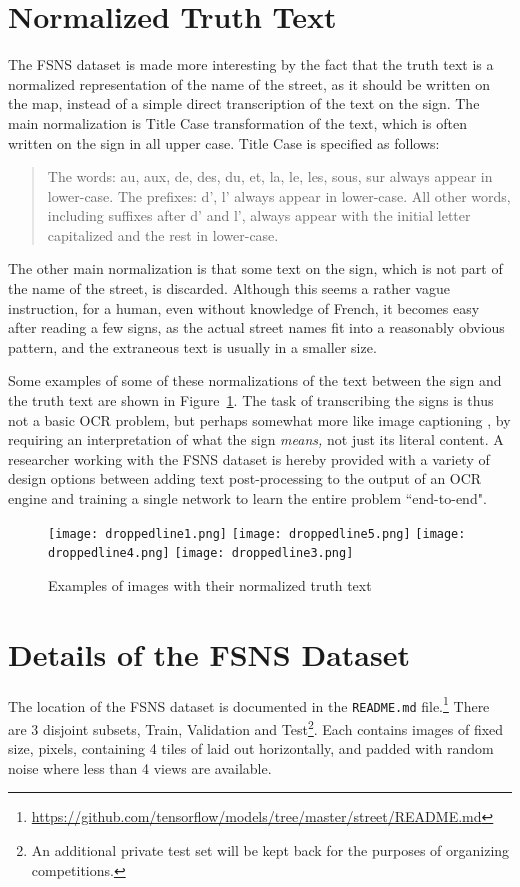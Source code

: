 \documentclass[runningheads]{llncs}
\begin{document}
\section{Normalized Truth Text} \label{normalizedtruth}
The FSNS dataset is made more interesting by the fact that the truth text is a normalized representation
 of the name of the street, as it should be written on the map, instead of a simple direct transcription
 of the text on the sign. The main normalization is Title Case transformation of the text, which is often
 written on the sign in all upper case. Title Case is specified as follows:
\begin{quote}
The words: au, aux, de, des, du, et, la, le, les, sous, sur  always appear in lower-case.
The prefixes: d', l' always appear in lower-case.
All other words, including suffixes after d' and l', always appear with the initial letter capitalized and the rest in lower-case.
\end{quote}
The other main normalization is that some text on the sign, which is not part of the name of the street, is discarded. Although this seems a rather vague instruction, for a human, even without knowledge of French, it becomes easy after reading a few signs, as the actual street names fit into a reasonably obvious pattern, and the extraneous text is usually in a smaller size.

Some examples of some of these normalizations of the text between the sign and the truth text are shown in
 Figure~\ref{fig:normalized}.
 The task of transcribing the signs is thus not a basic OCR problem, but perhaps somewhat more like image
 captioning \cite{vinyals2015show}, by requiring an interpretation of what the sign {\it means,} not just its
 literal content. A researcher working with the FSNS dataset is hereby provided with a variety of design
 options between adding text post-processing to the output of an OCR engine and training a single
 network to learn the entire problem ``end-to-end".

\begin{figure}
\centering
\texttt{[image: droppedline1.png]}
\texttt{[image: droppedline5.png]}
\texttt{[image: droppedline4.png]}
\texttt{[image: droppedline3.png]}
\caption{Examples of images with their normalized truth text}
\label{fig:normalized}
\end{figure}

\section{Details of the FSNS Dataset}
The location of the FSNS dataset is documented in the \texttt{README.md} file.\footnote{\url{https://github.com/tensorflow/models/tree/master/street/README.md}}
 There are 3 disjoint subsets, Train, Validation and Test\footnote{An additional private test set will
 be kept back for the purposes of organizing competitions.}. Each contains images of fixed size,
  pixels, containing 4 tiles of  laid out horizontally, and padded with random noise where less than 4 views are available.
\end{document}
